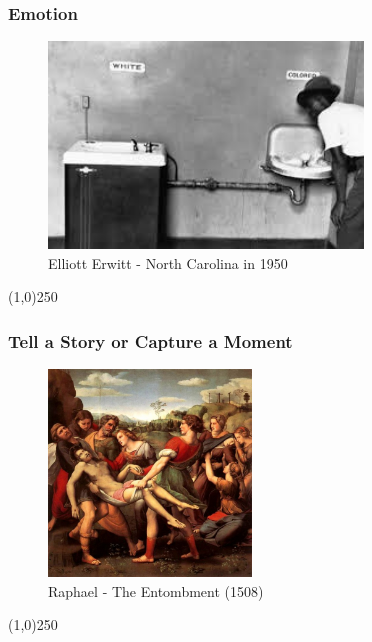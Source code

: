 \begin{frame}
\frametitle{Emotion}
\begin{figure}
	\centering
		\includegraphics[height=5.5cm]{img/candc/whitesNonWhites.jpg}
	\caption{Elliott Erwitt - North Carolina in 1950}
	\label{fig:ElliottErwittNC}
\end{figure}
\end{frame}
\begin{center}\line(1,0){250}\end{center}





\begin{frame}
\frametitle{Tell a Story or Capture a Moment}
\begin{figure}
	\centering
		\includegraphics[height=5.5cm]{img/candc/18-Raphael-Paintings.jpg}
	\caption{Raphael - The Entombment (1508)}
	\label{fig:RaphaelEntombment}
\end{figure}
\end{frame}
\begin{center}\line(1,0){250}\end{center}




